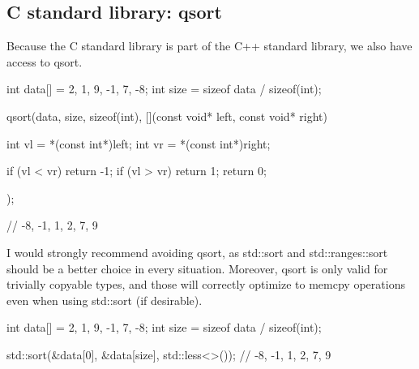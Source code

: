 \subsection{C standard library: qsort}

Because the C standard library is part of the C++ standard library, we also have access to qsort.

\begin{box-note}
\begin{cppcode}
int data[] = {2, 1, 9, -1, 7, -8};
int size = sizeof data / sizeof(int);

qsort(data, size, sizeof(int), [](const void* left, const void* right){
    int vl = *(const int*)left;
    int vr = *(const int*)right;

    if (vl < vr) return -1;
    if (vl > vr) return 1;
    return 0;
});

// -8, -1, 1, 2, 7, 9
\end{cppcode}
\end{box-note}

I would strongly recommend avoiding qsort, as std::sort and std::ranges::sort should be a better choice in every situation. Moreover, qsort is only valid for trivially copyable types, and those will correctly optimize to memcpy operations even when using std::sort (if desirable).

\begin{box-note}
\begin{cppcode}
int data[] = {2, 1, 9, -1, 7, -8};
int size = sizeof data / sizeof(int);

std::sort(&data[0], &data[size], std::less<>());
// -8, -1, 1, 2, 7, 9
\end{cppcode}
\end{box-note}